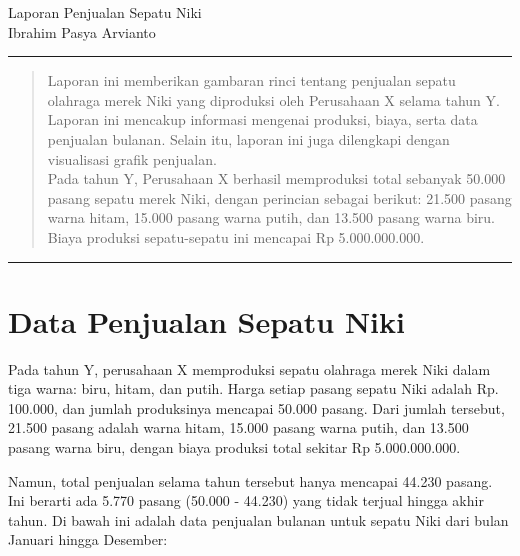 \documentclass[letterpaper,11pt]{article}
\begin{document}
  \begin{center}
      \huge{Laporan Penjualan Sepatu Niki} \\[10pt]
      \large{Ibrahim Pasya Arvianto}\\
  \end{center}
  \rule{\textwidth}{0.5pt}

      \begin{abstract}
      \noindent
      Laporan ini memberikan gambaran rinci tentang penjualan sepatu olahraga merek Niki yang diproduksi oleh Perusahaan X selama tahun Y. Laporan ini mencakup informasi mengenai produksi, biaya, serta data penjualan bulanan. Selain itu, laporan ini juga dilengkapi dengan visualisasi grafik penjualan. \\

      \noindent
      Pada tahun Y, Perusahaan X berhasil memproduksi total sebanyak 50.000 pasang sepatu merek Niki, dengan perincian sebagai berikut: 21.500 pasang warna hitam, 15.000 pasang warna putih, dan 13.500 pasang warna biru. Biaya produksi sepatu-sepatu ini mencapai Rp 5.000.000.000. 
      \end{abstract}
      
  \rule{\textwidth}{0.5pt}

\section{Data Penjualan Sepatu Niki}

  Pada tahun Y, perusahaan X memproduksi sepatu olahraga merek Niki dalam tiga warna: biru, hitam, dan putih. Harga setiap pasang sepatu Niki adalah Rp. 100.000, dan jumlah produksinya mencapai 50.000 pasang. Dari jumlah tersebut, 21.500 pasang adalah warna hitam, 15.000 pasang warna putih, dan 13.500 pasang warna biru, dengan biaya produksi total sekitar Rp 5.000.000.000.
  
  Namun, total penjualan selama tahun tersebut hanya mencapai 44.230 pasang. Ini berarti ada 5.770 pasang (50.000 - 44.230) yang tidak terjual hingga akhir tahun. Di bawah ini adalah data penjualan bulanan untuk sepatu Niki dari bulan Januari hingga Desember:
\end{document}
